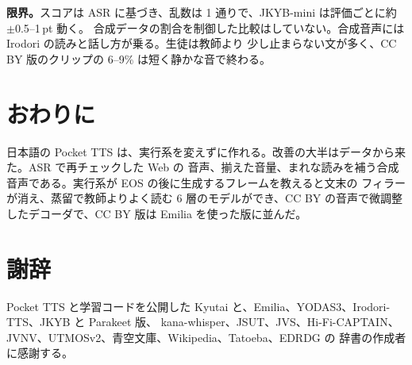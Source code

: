 \documentclass[10pt,a4paper,twocolumn]{article}
\newcommand{\pt}{\,pt}
\begin{document}
\textbf{限界。}スコアは ASR に基づき、乱数は 1 通りで、JKYB-mini は評価ごとに約 $\pm$0.5--1\pt{} 動く。
合成データの割合を制御した比較はしていない。合成音声には Irodori の読みと話し方が乗る。生徒は教師より
少し止まらない文が多く、CC BY 版のクリップの 6--9\% は短く静かな音で終わる。

\section{おわりに}
日本語の Pocket TTS は、実行系を変えずに作れる。改善の大半はデータから来た。ASR で再チェックした Web の
音声、揃えた音量、まれな読みを補う合成音声である。実行系が EOS の後に生成するフレームを教えると文末の
フィラーが消え、蒸留で教師よりよく読む 6 層のモデルができ、CC BY の音声で微調整したデコーダで、CC BY
版は Emilia を使った版に並んだ。

\section*{謝辞}
Pocket TTS と学習コードを公開した Kyutai と、Emilia、YODAS3、Irodori-TTS、JKYB と Parakeet 版、
kana-whisper、JSUT、JVS、Hi-Fi-CAPTAIN、JVNV、UTMOSv2、青空文庫、Wikipedia、Tatoeba、EDRDG の
辞書の作成者に感謝する。
\end{document}
